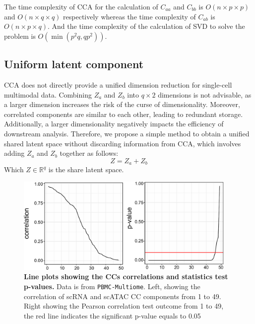 The time complexity of CCA for the calculation of $C_{aa}$ and $C_{bb}$ is $O(n\times p \times p)$ and $O(n\times q \times q)$ respectively whereas the time complexity of $C_{ab}$ is $O(n\times p \times q)$. And the time complexity of the  calculation of SVD to solve the problem is $O(\min(p^2q,qp^2))$.

\subsection{Uniform latent component}
CCA does not directly provide a unified dimension reduction for single-cell multimodal data. Combining $Z_a$ and $Z_b$ into $q\times 2$ dimensions is not advisable, as a larger dimension increases the risk of the curse of dimensionality. Moreover, correlated components are similar to each other, leading to redundant storage. Additionally, a larger dimensionality negatively impacts the efficiency of downstream analysis. Therefore, we propose a simple method to obtain a unified shared latent space without discarding information from CCA, which involves adding $Z_a$ and $Z_b$ together as follows:
\begin{equation}
    Z = Z_a + Z_b
\end{equation}
Which $Z\in \mathbb{R}^{q}$ is the share latent space.

\begin{figure}[!ht]
	\centering
	\includegraphics[width=0.95\textwidth]{CC_pval_select/fig}
	\vspace{0.1cm}
	\caption[Line plots showing the CCs correlations and statistics test p-values.]{\textbf{Line plots showing the CCs correlations and statistics test p-values.} Data is from \texttt{PBMC-Multiome}. Left, showing the correlation of scRNA and scATAC CC components from 1 to 49. Right showing the Pearson correlation test outcome from 1 to 49, the red line indicates the significant p-value equals to 0.05}
	\label{fig:CC_pval_select}
\end{figure}


